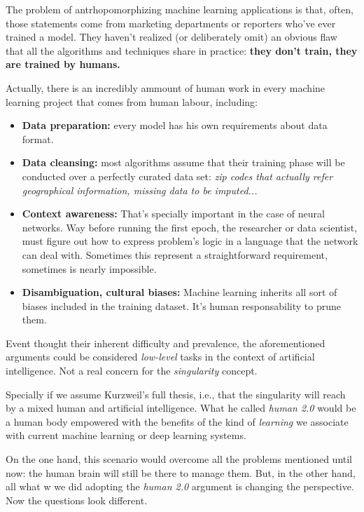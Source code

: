 The problem of antrhopomorphizing machine learning applications is that, often, 
those statements come from marketing departments or reporters who've ever trained 
a model. They haven't realized (or deliberately omit) an obvious flaw that all 
the algorithms and techniques share in practice: \textbf{they don't train, they 
are trained by humans.}

Actually, there is an incredibly ammount of human work in every machine learning 
project that comes from human labour, including: 

\begin{itemize}
	\item \textbf{Data preparation:} every model has his own requirements about 
		data format. 
	\item \textbf{Data cleansing:} most algorithms assume that their training 
		phase will be conducted over a perfectly curated data set: \textit{
		zip codes that actually refer geographical information, missing data 
		to be imputed...}
	\item \textbf{Context awareness:} That's specially important in the case 
		of neural networks. Way before running the first epoch, the researcher 
		or data scientist, must figure out how to express problem's logic in a 
		language that the network can deal with. Sometimes this represent a 
		straightforward requirement, sometimes is nearly impossible. 
	\item \textbf{Disambiguation, cultural biases:} Machine learning inherits \cite{gorilla}
		all sort of biases included in the training dataset. It's human responsability 
		to prune them.  
\end{itemize}

Event thought their inherent difficulty and prevalence, the aforementioned arguments 
could be considered \textit{low-level} tasks in the context of artificial 
intelligence. Not a real concern for the \textit{singularity} concept.

Specially if we assume Kurzweil's full thesis, i.e., that the singularity will 
reach by a mixed human and artificial intelligence. What he called \textit{human 
2.0} would be a human body empowered with the benefits of the kind of \textit{
learning} we associate with current machine learning or deep learning systems.

On the one hand, this scenario would overcome all the problems mentioned until now: 
the human brain will still be there to manage them. But, in the other hand, all what w
we did adopting the \textit{human 2.0} argument is changing the perspective. Now 
the questions look different.

